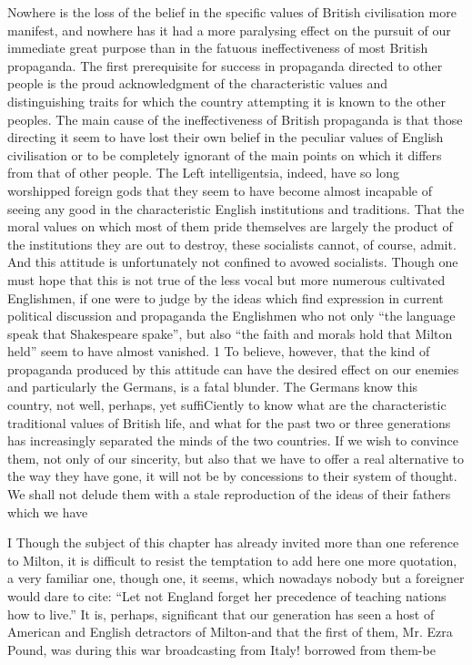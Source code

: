 \documentclass[11pt,openany]{book}
\begin{document}
Nowhere is the loss of the belief in the specific values of British civilisation more manifest, and nowhere has it had a more paralysing effect on the pursuit of our immediate great purpose than in the fatuous ineffectiveness of most British propaganda. The first prerequisite for success in propaganda directed to other people is the proud acknowledgment of the characteristic values and distinguishing traits for which the country attempting it is known to the other peoples. The main cause of the ineffectiveness of British propaganda is that those directing it seem to have lost their own belief in the peculiar values of English civilisation or to be completely ignorant of the main points on which it differs from that of other people. The Left intelligentsia, indeed, have so long worshipped foreign gods that they seem to have become almost incapable of seeing any good in the characteristic English institutions and traditions. That the moral values on which most of them pride themselves are largely the product of the institutions they are out to destroy, these socialists cannot, of course, admit. And this attitude is unfortunately not confined to avowed socialists. Though one must hope that this is not true of the less vocal but more numerous cultivated Englishmen, if one were to judge by the ideas which find expression in current political discussion and propaganda the Englishmen who not only ``the language speak that Shakespeare spake'', but also ``the faith and morals hold that Milton held'' seem to have almost vanished. 1 To believe, however, that the kind of propaganda produced by this attitude can have the desired effect on our enemies and particularly the Germans, is a fatal blunder. The Germans know this country, not well, perhaps, yet suffiCiently to know what are the characteristic traditional values of British life, and what for the past two or three generations has increasingly separated the minds of the two countries. If we wish to convince them, not only of our sincerity, but also that we have to offer a real alternative to the way they have gone, it will not be by concessions to their system of thought. We shall not delude them with a stale reproduction of the ideas of their fathers which we have

I Though the subject of this chapter has already invited more than one reference to Milton, it is difficult to resist the temptation to add here one more quotation, a very familiar one, though one, it seems, which nowadays nobody but a foreigner would dare to cite: ``Let not England forget her precedence of teaching nations how to live.'' It is, perhaps, significant that our generation has seen a host of American and English detractors of Milton-and that the first of them, Mr. Ezra Pound, was during this war broadcasting from Italy! borrowed from them-be
\end{document}
